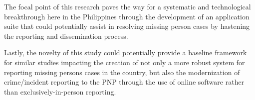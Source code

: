 The focal point of this research paves the way for a systematic and technological breakthrough here in the Philippines through the development of an application suite that could potentially assist in resolving missing person cases by hastening the reporting and dissemination process.

Lastly, the novelty of this study could potentially provide a baseline framework for similar studies impacting the creation of not only a more robust system for reporting missing persons cases in the country, but also the modernization of crime/incident reporting to the PNP through the use of online software rather than exclusively-in-person reporting.


